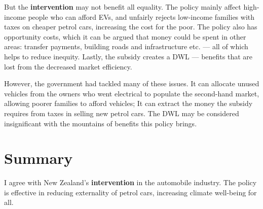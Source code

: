 \documentclass[a4paper,12pt]{article}
\begin{document}
But the \textbf{intervention} may not benefit all equality. The policy mainly affect high-income people who can afford EVs, and unfairly rejects low-income families with taxes on cheaper petrol cars, increasing the cost for the poor. The policy also has opportunity costs, which it can be argued that money could be spent in other areas: transfer payments, building roads and infrastructure etc. --- all of which helps to reduce inequity. Lastly, the subsidy creates a DWL  --- benefits that are lost from the decreased market efficiency.

However, the government had tackled many of these issues. It can allocate unused vehicles from the owners who went electrical to populate the second-hand market, allowing poorer families to afford vehicles; It can extract the money the subsidy requires from taxes in selling new petrol cars. The DWL may be considered insignificant with the mountains of benefits this policy brings.

\section*{Summary}
I agree with New Zealand's \textbf{intervention} in the automobile industry. The policy is effective in reducing externality of petrol cars, increasing climate well-being for all.
\end{document}
